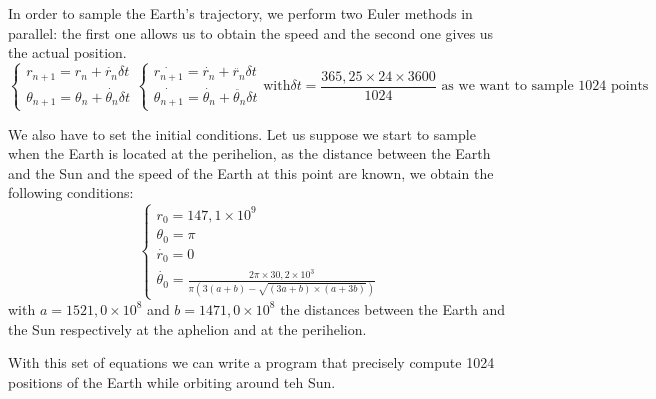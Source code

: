 In order to sample the Earth's trajectory, we perform two Euler methods in parallel: the first one allows us to obtain the speed and the second one gives us the actual position.
\[
\begin{equation}
    \begin{cases}
    r_{n+1} = r_{n} + \dot{r_{n}} \delta t\\
    \theta_{n+1} = \theta_{n} + \dot{\theta_{n}} \delta t
\end{cases}
\end{equation}

\begin{equation}
    \begin{cases}
    \dot{r_{n+1}} = \dot{r_{n}} + \ddot{r_{n}} \delta t\\
    \dot{\theta_{n+1}} = \dot{\theta_{n}} + \ddot{\theta_{n}} \delta t
    \end{cases}
\end{equation}

\text{with}
\delta t = \frac{365,25 \times 24 \times 3600}{1024}
\text{ as we want to sample 1024 points}
\]

We also have to set the initial conditions. Let us suppose we start to sample when the Earth is located at the perihelion, as the distance between the Earth and the Sun and the speed of the Earth at this point are known, we obtain the following conditions:
\[
\begin{equation}
    \begin{cases}
    r_{0} = 147,1 \times 10^{9}\\
    \theta_{0} = \pi\\
    \dot{r_{0}} = 0\\
    \dot{\theta_{0}} = \frac{2\pi \times 30,2 \times 10^{3}}{\pi \left( 3 (a + b) - \sqrt{(3a + b) \times (a + 3b)}\right)}
    \end{cases}
\end{equation}

\]
with \(a = 1521,0 \times 10^{8}\) and \(b = 1471,0 \times 10^{8}\) the distances between the Earth and the Sun respectively at the aphelion and at the perihelion.

With this set of equations we can write a program that precisely compute 1024 positions of the Earth while orbiting around teh Sun.

